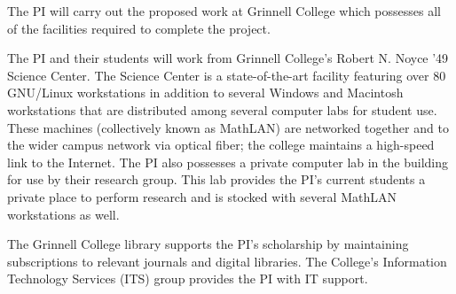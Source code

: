 \documentclass[11pt]{article}
\begin{document}
\startdoc{\shorttitle}

The PI will carry out the proposed work at Grinnell College which possesses all of the facilities required to complete the project.

The PI and their students will work from Grinnell College's Robert N. Noyce '49 Science Center.
The Science Center is a state-of-the-art facility featuring over 80 GNU/Linux workstations in addition to several Windows and Macintosh workstations that are distributed among several computer labs for student use.
These machines (collectively known as MathLAN) are networked together and to the wider campus network via optical fiber; the college maintains a high-speed link to the Internet.
The PI also possesses a private computer lab in the building for use by their research group.
This lab provides the PI's current students a private place to perform research and is stocked with several MathLAN workstations as well.

The Grinnell College library supports the PI's scholarship by maintaining subscriptions to relevant journals and digital libraries.
The College's Information Technology Services (ITS) group provides the PI with IT support.
\end{document}
